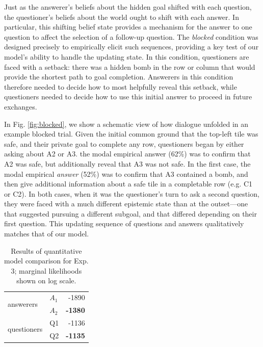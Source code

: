 \documentclass[12pt, floatsintext, jou]{apa6}
\begin{document}
Just as the answerer's beliefs about the hidden goal shifted with each question, the questioner's beliefs about the world ought to shift with each answer. 
In particular, this shifting belief state provides a mechanism for the answer to one question to affect the selection of a follow-up question.
The \emph{blocked} condition was designed precisely to empirically elicit such sequences, providing a key test of our model's ability to handle the updating state.
In this condition, questioners are faced with a setback: there was a hidden bomb in the row or column that would provide the shortest path to goal completion.
Answerers in this condition therefore needed to decide how to most helpfully reveal this setback, while questioners needed to decide how to use this initial answer to proceed in future exchanges.

In Fig. \ref{fig:blocked}, we show a schematic view of how dialogue unfolded in an example blocked trial.
Given the initial common ground that the top-left tile was safe, and their private goal to complete any row, questioners began by either asking about A2 or A3.
the modal empirical answer (62\%) was to confirm that A2 was safe, but additionally reveal that A3 was not safe.
In the first case, the modal empirical \emph{answer} (52\%) was to confirm that A3 contained a bomb, and then give additional information about a safe tile in a completable row (e.g. C1 or C2).  
In both cases, when it was the questioner's turn to ask a second question, they were faced with a much different epistemic state than at the outset---one that suggested pursuing a different subgoal, and that differed depending on their first question. 
This updating sequence of questions and answers qualitatively matches that of our model.

\begin{table}[]
\begin{center}
\begin{tabular}{@{}llr@{}}
\toprule
\multirow{2}{*}{answerers} & $A_1$ & -1890 \\ \cmidrule(l){2-3} 
 & $A_2$ & \textbf{-1380} \\ \midrule
\multirow{2}{*}{questioners} & Q1 & -1136  \\ \cmidrule(l){2-3} 
 & Q2 & \textbf{-1135} \\ \bottomrule
\end{tabular}
\end{center}
\caption{Results of quantitative model comparison for Exp. 3; marginal likelihoods shown on log scale.}
\label{table:exp3likelihoods}
\end{table}
\end{document}
